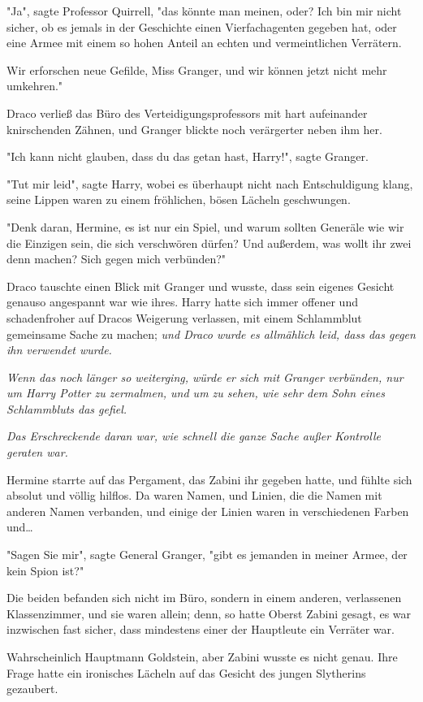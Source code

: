 {"Ja", sagte Professor Quirrell, "das könnte man meinen, oder? Ich bin mir nicht sicher, ob es jemals in der Geschichte einen Vierfachagenten gegeben hat, oder eine Armee mit einem so hohen Anteil an echten und vermeintlichen Verrätern.

Wir erforschen neue Gefilde, Miss Granger, und wir können jetzt nicht mehr umkehren."

Draco verließ das Büro des Verteidigungsprofessors mit hart aufeinander knirschenden Zähnen, und Granger blickte noch verärgerter neben ihm her.

"Ich kann nicht glauben, dass du das getan hast, Harry!", sagte Granger.

"Tut mir leid", sagte Harry, wobei es überhaupt nicht nach Entschuldigung klang, seine Lippen waren zu einem fröhlichen, bösen Lächeln geschwungen.

"Denk daran, Hermine, es ist nur ein Spiel, und warum sollten Generäle wie wir die Einzigen sein, die sich verschwören dürfen? Und außerdem, was wollt ihr zwei denn machen? Sich gegen mich verbünden?"

Draco tauschte einen Blick mit Granger und wusste, dass sein eigenes Gesicht genauso angespannt war wie ihres. Harry hatte sich immer offener und schadenfroher auf Dracos Weigerung verlassen, mit einem Schlammblut gemeinsame Sache zu machen; \emph{und Draco wurde es allmählich leid, dass das gegen ihn verwendet wurde.}

\emph{Wenn das noch länger so weiterging, würde er sich mit Granger verbünden, nur um Harry Potter zu zermalmen, und um zu sehen, wie sehr dem Sohn eines Schlammbluts das gefiel.}

\emph{Das Erschreckende daran war, wie schnell die ganze Sache außer Kontrolle geraten war.}

Hermine starrte auf das Pergament, das Zabini ihr gegeben hatte, und fühlte sich absolut und völlig hilflos. Da waren Namen, und Linien, die die Namen mit anderen Namen verbanden, und einige der Linien waren in verschiedenen Farben und…

"Sagen Sie mir", sagte General Granger, "gibt es jemanden in meiner Armee, der kein Spion ist?"

Die beiden befanden sich nicht im Büro, sondern in einem anderen, verlassenen Klassenzimmer, und sie waren allein; denn, so hatte Oberst Zabini gesagt, es war inzwischen fast sicher, dass mindestens einer der Hauptleute ein Verräter war.

Wahrscheinlich Hauptmann Goldstein, aber Zabini wusste es nicht genau. Ihre Frage hatte ein ironisches Lächeln auf das Gesicht des jungen Slytherins gezaubert.

}
